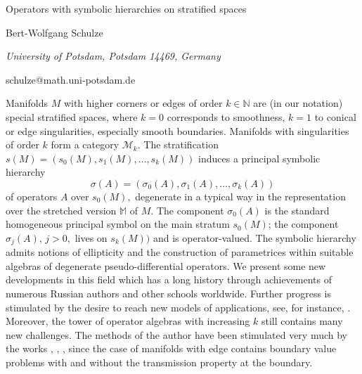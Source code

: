 \documentclass[10pt,a4paper]{article}
\begin{document}
\begin{center}

{\Large Operators with symbolic hierarchies on stratified spaces}

\bigskip

{\sc Bert-Wolfgang Schulze}

{\small\it University of Potsdam, Potsdam 14469, Germany}

{\small\rm schulze@math.uni-potsdam.de}

\end{center}

\bigskip


Manifolds $M$ with higher corners or edges of order  $k \in \mathbb{N}$ are (in our notation) special stratified spaces, where $k=0$ corresponds to smoothness, $k = 1$ to conical or edge singularities, especially smooth boundaries. Manifolds with singularities of order $k$ form a category $ \mathcal{M}_k.$ The stratification $s(M)=(s_0(M),s_1(M),\dots ,s_k(M))$  induces a principal symbolic hierarchy $$\sigma (A)=(\sigma _0(A),\sigma _1(A),\dots ,\sigma _k(A))$$ of operators $A$ over $s_0(M),$ degenerate in a typical way in the representation over the stretched version $\mathbb{M}$ of $M.$ The component $\sigma_0(A)$ is the standard homogeneous principal symbol on the main stratum $s_0(M)$; the component $\sigma_j(A),\,j>0,$ lives on $s_k(M))$ and is operator-valued. The symbolic hierarchy admits notions of ellipticity and the construction of parametrices within suitable algebras of degenerate pseudo-differential operators. We present some new developments in this field which has a long history through achievements of numerous Russian authors and other schools worldwide. Further progress is stimulated by the desire to reach new models of applications, see, for instance, \cite{Flad3}. Moreover, the tower of operator algebras with increasing $k$ still contains many new challenges. The methods of the author have been stimulated very much by the works \cite{Vivs2}, \cite{Vivs3}, \cite{Eski2}, since the case of manifolds with edge contains boundary value problems with and without the transmission property at the boundary.
\end{document}
